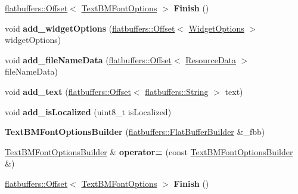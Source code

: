 \begin{DoxyCompactItemize}
\item 
\mbox{\label{structflatbuffers_1_1TextBMFontOptionsBuilder_aa0a15381cc8ac862fa9c66d17b42f696}} 
\hyperlink{structflatbuffers_1_1Offset}{flatbuffers\+::\+Offset}$<$ \hyperlink{structflatbuffers_1_1TextBMFontOptions}{Text\+B\+M\+Font\+Options} $>$ {\bfseries Finish} ()
\item 
\mbox{\label{structflatbuffers_1_1TextBMFontOptionsBuilder_a868d23cfdf4cfc29a43b8344d4104b51}} 
void {\bfseries add\+\_\+widget\+Options} (\hyperlink{structflatbuffers_1_1Offset}{flatbuffers\+::\+Offset}$<$ \hyperlink{structflatbuffers_1_1WidgetOptions}{Widget\+Options} $>$ widget\+Options)
\item 
\mbox{\label{structflatbuffers_1_1TextBMFontOptionsBuilder_a9174c38d85de8b17bb73844e9257aa87}} 
void {\bfseries add\+\_\+file\+Name\+Data} (\hyperlink{structflatbuffers_1_1Offset}{flatbuffers\+::\+Offset}$<$ \hyperlink{structflatbuffers_1_1ResourceData}{Resource\+Data} $>$ file\+Name\+Data)
\item 
\mbox{\label{structflatbuffers_1_1TextBMFontOptionsBuilder_a493b502ebde77016eb8b2f85ae9f3e99}} 
void {\bfseries add\+\_\+text} (\hyperlink{structflatbuffers_1_1Offset}{flatbuffers\+::\+Offset}$<$ \hyperlink{structflatbuffers_1_1String}{flatbuffers\+::\+String} $>$ text)
\item 
\mbox{\label{structflatbuffers_1_1TextBMFontOptionsBuilder_acab2a4c64962224265896dff8bfd91a8}} 
void {\bfseries add\+\_\+is\+Localized} (uint8\+\_\+t is\+Localized)
\item 
\mbox{\label{structflatbuffers_1_1TextBMFontOptionsBuilder_aeb9ef1010cab4fd370ab43ab18f341bb}} 
{\bfseries Text\+B\+M\+Font\+Options\+Builder} (\hyperlink{classflatbuffers_1_1FlatBufferBuilder}{flatbuffers\+::\+Flat\+Buffer\+Builder} \&\+\_\+fbb)
\item 
\mbox{\label{structflatbuffers_1_1TextBMFontOptionsBuilder_abcc6d6c3f6aa7c810f7c635c75112866}} 
\hyperlink{structflatbuffers_1_1TextBMFontOptionsBuilder}{Text\+B\+M\+Font\+Options\+Builder} \& {\bfseries operator=} (const \hyperlink{structflatbuffers_1_1TextBMFontOptionsBuilder}{Text\+B\+M\+Font\+Options\+Builder} \&)
\item 
\mbox{\label{structflatbuffers_1_1TextBMFontOptionsBuilder_aa0a15381cc8ac862fa9c66d17b42f696}} 
\hyperlink{structflatbuffers_1_1Offset}{flatbuffers\+::\+Offset}$<$ \hyperlink{structflatbuffers_1_1TextBMFontOptions}{Text\+B\+M\+Font\+Options} $>$ {\bfseries Finish} ()
\end{DoxyCompactItemize}
